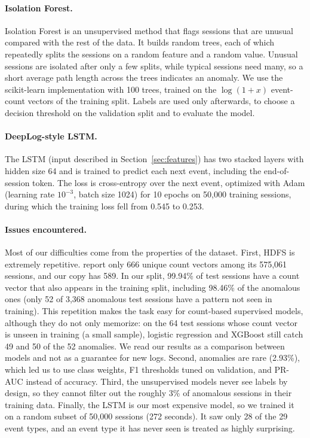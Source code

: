 \documentclass[11pt]{article}
\begin{document}
\paragraph{Isolation Forest.} Isolation Forest \citep{4781136} is an
unsupervised method that flags sessions that are unusual compared with the rest of the data. It builds
random trees, each of which repeatedly splits the sessions on a random feature and
a random value. Unusual sessions are isolated after only a few splits, while typical
sessions need many, so a short average path length across the trees indicates an
anomaly. We use the scikit-learn implementation with 100 trees, trained on the
$\log(1+x)$ event-count vectors of the training split. Labels are used only afterwards,
to choose a decision threshold on the validation split and to evaluate the model.

\paragraph{DeepLog-style LSTM.} The LSTM (input described in Section~\ref{sec:features}) has
two stacked layers with hidden size 64 and is trained to predict each next event, including
the end-of-session token. The loss is cross-entropy over the next event, optimized with Adam
(learning rate $10^{-3}$, batch size 1024) for 10 epochs on 50,000 training sessions, during
which the training loss fell from 0.545 to 0.253.

\paragraph{Issues encountered.} Most of our difficulties come from the properties of the
dataset. First, HDFS is extremely repetitive. \citet{Landauer2024} report
only 666 unique count vectors among its 575,061 sessions, and our copy has 589. In our
split, 99.94\% of test sessions have a count vector that also appears in the training
split, including 98.46\% of the anomalous ones (only 52 of 3,368 anomalous test sessions
have a pattern not seen in training). This repetition makes the task easy for count-based
supervised models, although they do not only memorize: on the 64 test sessions whose count
vector is unseen in training (a small sample), logistic regression and XGBoost still catch
49 and 50 of the 52 anomalies. We read our results as a comparison between models and not
as a guarantee for new logs. Second, anomalies are rare (2.93\%), which led us to use class
weights, F1 thresholds tuned on validation, and PR-AUC instead of accuracy. Third, the
unsupervised models never see labels by design, so they cannot filter out the roughly
3\% of anomalous sessions in their training data. Finally, the LSTM is our most expensive
model, so we trained it on a random subset of 50,000 sessions (272 seconds). It saw only 28
of the 29 event types, and an event type it has never seen is treated as highly surprising.
\end{document}
